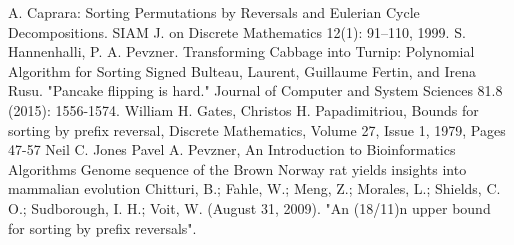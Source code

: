 	\setLTRbibitems
	\begin{thebibliography}{9}
     A. Caprara: Sorting Permutations by Reversals and Eulerian Cycle Decompositions. SIAM J. on Discrete Mathematics 12(1): 91–110, 1999.
     S. Hannenhalli, P. A. Pevzner. Transforming Cabbage into Turnip: Polynomial Algorithm for Sorting Signed
     Bulteau, Laurent, Guillaume Fertin, and Irena Rusu. "Pancake flipping is hard." Journal of Computer and System Sciences 81.8 (2015): 1556-1574.
     William H. Gates, Christos H. Papadimitriou, Bounds for sorting by prefix reversal, Discrete Mathematics, Volume 27, Issue 1, 1979, Pages 47-57
     Neil C. Jones Pavel A. Pevzner, An Introduction to Bioinformatics Algorithms
     Genome sequence of the Brown Norway rat yields insights into mammalian evolution
     Chitturi, B.; Fahle, W.; Meng, Z.; Morales, L.; Shields, C. O.; Sudborough, I. H.; Voit, W. (August 31, 2009). "An (18/11)n upper bound for sorting by prefix reversals". 
    \end{thebibliography}
